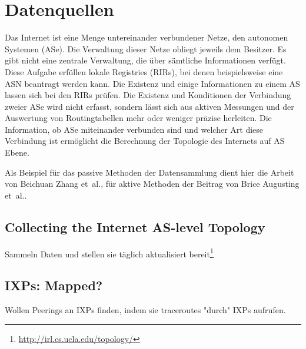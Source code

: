 \section{Datenquellen}\label{sec:datenquellen}

Das Internet ist eine Menge untereinander verbundener Netze, den autonomen
Systemen (ASe). Die Verwaltung dieser Netze obliegt jeweils dem Besitzer. Es
gibt nicht eine zentrale Verwaltung, die über sämtliche Informationen verfügt.
Diese Aufgabe erfüllen lokale Registries (RIRs), bei denen beispielsweise eine
ASN beantragt werden kann. Die Existenz und einige Informationen zu einem AS
lassen sich bei den RIRs prüfen. Die Existenz und Konditionen der Verbindung
zweier ASe wird nicht erfasst, sondern lässt sich aus aktiven Messungen und der
Auswertung von Routingtabellen mehr oder weniger präzise herleiten. Die
Information, ob ASe miteinander verbunden sind und welcher Art diese Verbindung
ist ermöglicht die Berechnung der Topologie des Internets auf AS Ebene.

Als Beispiel für das passive Methoden der Datensammlung dient hier die Arbeit
von Beichuan Zhang et\ al., für aktive Methoden der Beitrag von Brice Augusting
et\ al..

\subsection{Collecting the Internet AS-level Topology~\cite{Zhang:2005:CIA:1052812.1052825}}

Sammeln Daten und stellen sie täglich aktualisiert bereit\footnote{\url{http://irl.cs.ucla.edu/topology/}}


\subsection{IXPs: Mapped?~\cite{Augustin:2009:IM:1644893.1644934}}

Wollen Peerings an IXPs finden, indem sie traceroutes "durch" IXPs aufrufen.

